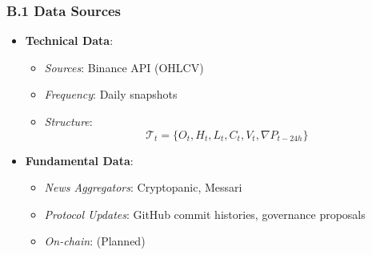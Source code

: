 \documentclass[12pt]{article}
\begin{document}
\subsubsection*{B.1 Data Sources}
\begin{itemize}
\item \textbf{Technical Data}:
\begin{itemize}
\item \textit{Sources}: Binance API (OHLCV)
\item \textit{Frequency}: Daily snapshots
\item \textit{Structure}:
\[\mathscr{T}_t = \{O_t, H_t, L_t, C_t, V_t, \nabla P_{t-24h}\}\]
\end{itemize}

\item \textbf{Fundamental Data}:
\begin{itemize}
\item \textit{News Aggregators}: Cryptopanic, Messari
\item \textit{Protocol Updates}: GitHub commit histories, governance proposals
\item \textit{On-chain}: (Planned)
\end{itemize}
\end{itemize}
\end{document}

